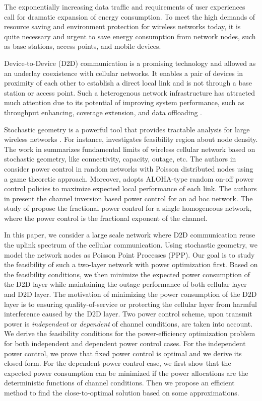 \documentclass[12pt, draftclsnofoot, journal, letterpaper, onecolumn]{IEEEtran}
\begin{document}
The exponentially increasing data traffic and requirements of user experiences call for dramatic expansion of energy consumption. To meet the high demands of resource saving and environment protection for wireless networks today, it is quite necessary and urgent to save energy consumption from network nodes, such as base stations, access points, and mobile devices.

Device-to-Device (D2D) communication is a promising technology and allowed as an underlay coexistence with cellular networks. It enables a pair of devices in proximity of each other to establish a direct local link and is not through a base station or access point. Such a heterogenous network infrastructure has attracted much attention due to its potential of improving system performance, such as throughput enhancing, coverage extension, and data offloading \cite{D2DLTEA,DAD2D,PCD2D}.


Stochastic geometry \cite{baccelli2009stochastic,baccelli2009stochastic2,interference} is a powerful tool that provides tractable analysis for large wireless networks \cite{overlaid,SGRG,RPC2,FPC,OP}. For instance, \cite{overlaid} investigates feasibility region about node density. The work in \cite{SGRG} summarizes fundamental limits of wireless cellular network based on stochastic geometry, like connectivity, capacity, outage, etc.
The authors in \cite{RPC2} consider power control in random networks with Poisson distributed nodes using a game theoretic approach. Moreover, \cite{RPC2} adopts ALOHA-type random on-off power control policies to maximize expected local performance of each link. The authors in \cite{OP} present the channel inversion based power control for an ad hoc network. The study of \cite{FPC} propose the fractional power control for a single homogeneous network, where the power control is the fractional exponent of the channel.

In this paper, we consider a large scale network where D2D communication reuse the uplink spectrum of the cellular communication. Using stochastic geometry, we model the network nodes as Poisson Point Processes (PPP). Our goal is to study the feasibility of such a two-layer network with power optimization first. Based on the feasibility conditions, we then minimize the expected power consumption of the D2D layer while maintaining the outage performance of both cellular layer and D2D layer. The motivation of minimizing the power consumption of the D2D layer is to ensuring quality-of-service or protecting the cellular layer from harmful interference caused by the D2D layer. Two power control scheme, upon transmit power is \emph{independent} or \emph{dependent} of channel conditions, are taken into account. We derive the feasibility conditions for the power-efficiency optimization problem for both independent and dependent power control cases. For the independent power control, we prove that fixed power control is optimal and we derive its closed-form. For the dependent power control case, we first show that the expected power consumption can be minimized if the power allocations are the deterministic functions of channel conditions. Then we propose an efficient method to find the close-to-optimal solution based on some approximations.
\end{document}
